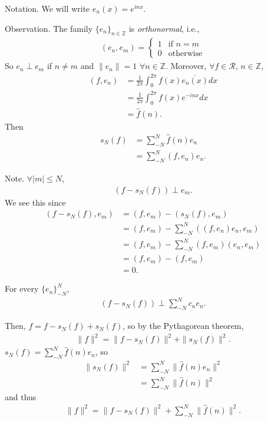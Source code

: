 \documentclass[11pt]{article}
\begin{document}
Notation. We will write $e_n(x) = e^{inx}$.

Observation. The family $\{ e_n \}_{n \in \mathbb{Z}}$ is \emph{orthonormal}, i.e., \begin{align*} (e_n, e_m) = \begin{cases} 1 & \text{if } n = m \\ 0 & \text{otherwise} \end{cases}
\end{align*} So $e_n \perp e_m$ if $n \neq m$ and $\| e_n \| = 1$ $\forall n \in \mathbb{Z}$. Moreover, $\forall f \in \mathcal{R}$, $n \in \mathbb{Z}$, \begin{align*} (f, e_n) & = \frac{1}{2\pi} \int_0^{2\pi} f(x) \overline{e_n(x)} dx \\ & = \frac{1}{2\pi} \int_0^{2\pi} f(x) e^{-inx} dx \\ & = \hat{f}(n).
\end{align*} Then \begin{align*} s_N (f) & = \sum_{-N}^N \hat{f}(n) e_n \\ & = \sum_{-N}^N (f, e_n)e_n.
\end{align*}

Note. $\forall |m| \le N$, \begin{align*} (f - s_N(f)) \perp e_m.
\end{align*} We see this since \begin{align*} (f - s_N(f), e_m) & = (f, e_m) - (s_N(f), e_m) \\ & = (f, e_m) - \sum_{-N}^N ((f, e_n)e_n, e_m) \\ & = (f, e_m) - \sum_{-N}^N (f, e_m)(e_n, e_m) \\ & = (f, e_m) - (f, e_m) \\ & = 0.
\end{align*}

\begin{corollary} For every $\{ e_n \}_{-N}^N$, \begin{align*} (f - s_N(f)) \perp \sum_{-N}^N c_n e_n.
\end{align*}
\end{corollary}

Then, $f = f - s_N(f) + s_N(f)$, so by the Pythagorean theorem, \begin{align*} \| f \|^2 = \| f - s_N(f) \|^2 + \| s_N(f) \|^2.
\end{align*}
$s_N(f) = \sum_{-N}^N \hat{f}(n) e_n$, so \begin{align*} \| s_N(f) \|^2 & = \sum_{-N}^N \| \hat{f}(n) e_n \|^2 \\ & = \sum_{-N}^N \| \hat{f}(n) \|^2
\end{align*} and thus \begin{align*} \| f \|^2 = \| f - s_N(f) \|^2 + \sum_{-N}^N \| \hat{f}(n) \|^2. \tag{2}
\end{align*}
\end{document}
